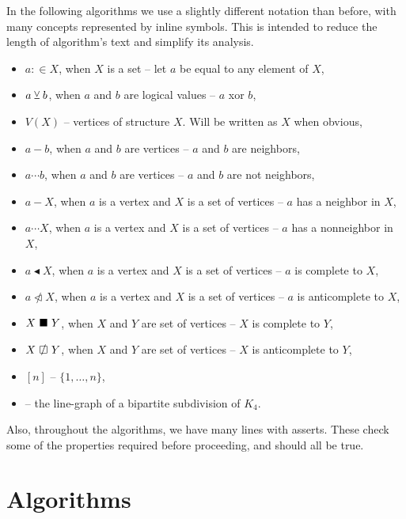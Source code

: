 In the following algorithms we use a slightly different notation than before, with many concepts represented by inline symbols. This is intended to reduce the length of algorithm's text and simplify its analysis.

\begin{itemize}
	\item $a :\in X$, when $X$ is a set -- let $a$ be equal to any element of $X$,
	\item $a \veebar b$, when $a$ and $b$ are logical values -- $a$ xor $b$,
	\item $V(X)$ -- vertices of structure $X$. Will be written as $X$ when obvious,
	\item $a - b$, when $a$ and $b$ are vertices -- $a$ and $b$ are neighbors,
	\item $a \cdots b$, when $a$ and $b$ are vertices -- $a$ and $b$ are not neighbors,
	\item $a - X$, when $a$ is a vertex and $X$ is a set of vertices -- $a$ has a neighbor in $X$,
	\item $a \cdots X$, when $a$ is a vertex and $X$ is a set of vertices -- $a$ has a nonneighbor in $X$,
	\item $a \blacktriangleleft  X$, when $a$ is a vertex and $X$ is a set of vertices -- $a$ is complete to $X$,
	\item $a \ntriangleleft X$, when $a$ is a vertex and $X$ is a set of vertices -- $a$ is anticomplete to $X$,
	\item $X \ \blacksquare\  Y$, when $X$ and $Y$ are set of vertices -- $X$ is complete to $Y$,
	\item $X \setAntiComplete Y$, when $X$ and $Y$ are set of vertices -- $X$ is anticomplete to $Y$,
	\item $[n]$  -- $\{1, \ldots, n\}$,
	\item \LGBSK -- the line-graph of a bipartite subdivision of $K_4$.
\end{itemize}

Also, throughout the algorithms, we have many lines with asserts. These check some of the properties required before proceeding, and should all be true.

\clearpage
\section{Algorithms}


\clearpage

